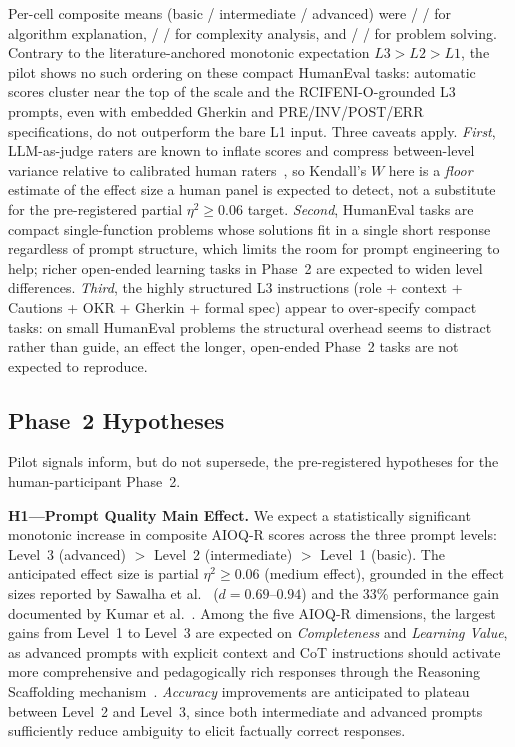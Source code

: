 \documentclass[runningheads]{llncs}
\begin{document}
Per-cell composite means (basic / intermediate / advanced) were \PilotAlgoBasic{} / \PilotAlgoInt{} / \PilotAlgoAdv{} for algorithm explanation, \PilotCxBasic{} / \PilotCxInt{} / \PilotCxAdv{} for complexity analysis, and \PilotPsBasic{} / \PilotPsInt{} / \PilotPsAdv{} for problem solving. Contrary to the literature-anchored monotonic expectation $L3>L2>L1$, the pilot shows no such ordering on these compact HumanEval tasks: automatic scores cluster near the top of the scale and the RCIFENI-O-grounded L3 prompts, even with embedded Gherkin and PRE/INV/POST/ERR specifications, do not outperform the bare L1 input. Three caveats apply. \emph{First}, LLM-as-judge raters are known to inflate scores and compress between-level variance relative to calibrated human raters~\cite{Liu2023}, so Kendall's $W$ here is a \emph{floor} estimate of the effect size a human panel is expected to detect, not a substitute for the pre-registered partial $\eta^2\geq0.06$ target. \emph{Second}, HumanEval tasks are compact single-function problems whose solutions fit in a single short response regardless of prompt structure, which limits the room for prompt engineering to help; richer open-ended learning tasks in Phase~2 are expected to widen level differences. \emph{Third}, the highly structured L3 instructions (role + context + Cautions + OKR + Gherkin + formal spec) appear to over-specify compact tasks: on small HumanEval problems the structural overhead seems to distract rather than guide, an effect the longer, open-ended Phase~2 tasks are not expected to reproduce.

\subsection{Phase~2 Hypotheses}\label{sec:phase2-hypo}

Pilot signals inform, but do not supersede, the pre-registered hypotheses for the human-participant Phase~2.

\textbf{H1---Prompt Quality Main Effect.} We expect a statistically significant monotonic increase in composite AIOQ-R scores across the three prompt levels: Level~3 (advanced) $>$ Level~2 (intermediate) $>$ Level~1 (basic). The anticipated effect size is partial $\eta^2 \geq 0.06$ (medium effect), grounded in the effect sizes reported by Sawalha et al.~\cite{Sawalha2024} ($d = 0.69$--$0.94$) and the 33\% performance gain documented by Kumar et al.~\cite{Kumar2025}. Among the five AIOQ-R dimensions, the largest gains from Level~1 to Level~3 are expected on \emph{Completeness} and \emph{Learning Value}, as advanced prompts with explicit context and CoT instructions should activate more comprehensive and pedagogically rich responses through the Reasoning Scaffolding mechanism~\cite{Wei2022}. \emph{Accuracy} improvements are anticipated to plateau between Level~2 and Level~3, since both intermediate and advanced prompts sufficiently reduce ambiguity to elicit factually correct responses.
\end{document}
